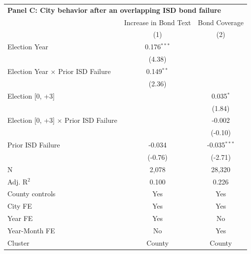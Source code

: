 \begingroup
\centering
\begin{tabular*}{\textwidth}{@{\extracolsep{\fill}}lcc}
\multicolumn{3}{l}{\textbf{Panel C: City behavior after an overlapping ISD bond failure}}\\

\addlinespace
   \toprule
                                                & Increase in Bond Text & Bond Coverage\\  
                                                & (1)                   & (2)\\  
   \midrule 
   Election Year                                & 0.176$^{***}$         &   \\   
                                                & (4.38)               &   \\   
   Election Year $\times$ Prior ISD Failure     & 0.149$^{**}$          &   \\   
                                                & (2.36)               &   \\   
   Election [0, +3]                             &                       & 0.035$^{*}$\\   
                                                &                       & (1.84)\\   
   Election [0, +3] $\times$ Prior ISD Failure  &                       & -0.002\\   
                                                &                       & (-0.10)\\   
   Prior ISD Failure                            & -0.034                & -0.035$^{***}$\\   
                                                & (-0.76)              & (-2.71)\\   
   \hline
   N                                 & 2,078                 & 28,320\\  
   Adj. R$^2$                               & 0.100                 & 0.226\\  
   County controls                              & Yes                   & Yes\\  
   City FE                                      & Yes                   & Yes\\  
   Year FE                                      & Yes                   & No\\  
   Year-Month FE                                & No                    & Yes\\  
   Cluster              & County & County\\  
   \bottomrule
\end{tabular*}
\par\endgroup
